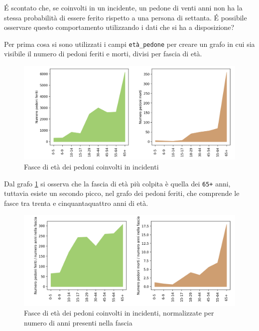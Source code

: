 \documentclass[a4paper]{report}
\newcommand{\columnstyle}[1]{\texttt{#1}}
\begin{document}
\'E scontato che, se coinvolti in un incidente, un pedone di venti anni non ha la stessa 
probabilità di essere ferito rispetto a una persona di settanta.
\'E possibile osservare questo comportamento utilizzando i dati che si ha a disposizione?

Per prima cosa si sono utilizzati i campi \columnstyle{età\_pedone} per creare un grafo 
in cui sia visibile il numero di pedoni feriti e morti, divisi per fascia di età.

\begin{figure}
    \includegraphics[width=\linewidth]{../src/incidenti/incidenti_senza_coords/pedoni/eta_pedoni_iniziale.png}
    \caption{Fasce di età dei pedoni coinvolti in incidenti}
    \label{fig:eta-pedoni-iniziale}
\end{figure}

Dal grafo \ref{fig:eta-pedoni-iniziale} si osserva che la fascia di età più colpita 
è quella dei \columnstyle{65+} anni, tuttavia esiste un secondo picco, nel grafo dei 
pedoni feriti, che  comprende le fasce tra trenta e cinquantaquattro anni di età.

\begin{figure}
    \includegraphics[width=\linewidth]{../src/incidenti/incidenti_senza_coords/pedoni/eta_pedoni.png}
    \caption{Fasce di età dei pedoni coinvolti in incidenti, normalizzate per numero di anni 
    presenti nella fascia}
    \label{fig:eta-pedoni}
\end{figure}
\end{document}
